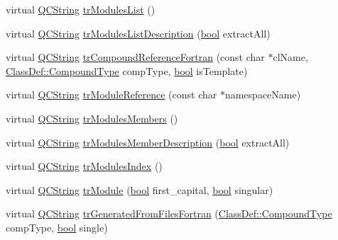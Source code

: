\begin{DoxyCompactItemize}
\item 
virtual \hyperlink{class_q_c_string}{Q\+C\+String} \hyperlink{class_translator_adapter__1__5__4_a8c578e4a7faff434305776d60bf426c2}{tr\+Modules\+List} ()
\item 
virtual \hyperlink{class_q_c_string}{Q\+C\+String} \hyperlink{class_translator_adapter__1__5__4_af9c8ae97e68ad952cfecc943ef5ab5f5}{tr\+Modules\+List\+Description} (\hyperlink{qglobal_8h_a1062901a7428fdd9c7f180f5e01ea056}{bool} extract\+All)
\item 
virtual \hyperlink{class_q_c_string}{Q\+C\+String} \hyperlink{class_translator_adapter__1__5__4_a6228a4426572140c72b31651e364fd62}{tr\+Compound\+Reference\+Fortran} (const char $\ast$cl\+Name, \hyperlink{class_class_def_ae70cf86d35fe954a94c566fbcfc87939}{Class\+Def\+::\+Compound\+Type} comp\+Type, \hyperlink{qglobal_8h_a1062901a7428fdd9c7f180f5e01ea056}{bool} is\+Template)
\item 
virtual \hyperlink{class_q_c_string}{Q\+C\+String} \hyperlink{class_translator_adapter__1__5__4_ab93cc7da9a21764cb9edd29bb9a569ae}{tr\+Module\+Reference} (const char $\ast$namespace\+Name)
\item 
virtual \hyperlink{class_q_c_string}{Q\+C\+String} \hyperlink{class_translator_adapter__1__5__4_aa9ce13b2c393e2b7b5f53defe2268279}{tr\+Modules\+Members} ()
\item 
virtual \hyperlink{class_q_c_string}{Q\+C\+String} \hyperlink{class_translator_adapter__1__5__4_ae531a1c2c29dbaa70739c13ffc1a47a5}{tr\+Modules\+Member\+Description} (\hyperlink{qglobal_8h_a1062901a7428fdd9c7f180f5e01ea056}{bool} extract\+All)
\item 
virtual \hyperlink{class_q_c_string}{Q\+C\+String} \hyperlink{class_translator_adapter__1__5__4_a39c7c9db86a64137d740f3dc58c65535}{tr\+Modules\+Index} ()
\item 
virtual \hyperlink{class_q_c_string}{Q\+C\+String} \hyperlink{class_translator_adapter__1__5__4_af1ce7323a98be5e8aebb11a30b71d445}{tr\+Module} (\hyperlink{qglobal_8h_a1062901a7428fdd9c7f180f5e01ea056}{bool} first\+\_\+capital, \hyperlink{qglobal_8h_a1062901a7428fdd9c7f180f5e01ea056}{bool} singular)
\item 
virtual \hyperlink{class_q_c_string}{Q\+C\+String} \hyperlink{class_translator_adapter__1__5__4_a152b3ffa1ca60f5224841cbda6a77ff5}{tr\+Generated\+From\+Files\+Fortran} (\hyperlink{class_class_def_ae70cf86d35fe954a94c566fbcfc87939}{Class\+Def\+::\+Compound\+Type} comp\+Type, \hyperlink{qglobal_8h_a1062901a7428fdd9c7f180f5e01ea056}{bool} single)
\item 

\end{DoxyCompactItemize}

